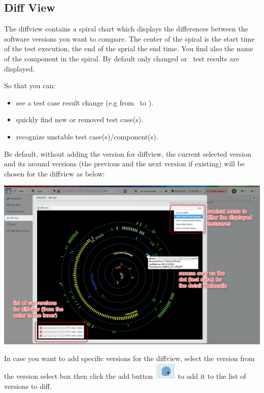 \hypertarget{diff-view}{%
\subsection{Diff View}\label{diff-view}}
The diffview contains a spiral chart which displays the differences 
between the software versions you want to compare. 
The center of the spiral is the start time of the test execution,
the end of the sprial the end time. You find also the name of the
component in the spiral.
By default only changed or \failed\ test results are displayed.

So that you can:
\begin{itemize}
   \item see a test case result change (e.g from \passed\ to \failed).
   \item quickly find new or removed test case(s).
   \item recognize unstable test case(s)/component(s). 
\end{itemize}

Be default, without adding the version for diffview, the current selected 
version and its around versions (the previous and the next version if existing) 
will be chosen for the diffview as below:

\includegraphics[width=1\linewidth]{./pictures/diffview/default_detail.png}

In case you want to add specific versions for the diffview, select the version
from the version select box then click the add button 
\includegraphics[width=0.04\linewidth]{./pictures/diffview/add_button.png}
to add it to the list of versions to diff. 

